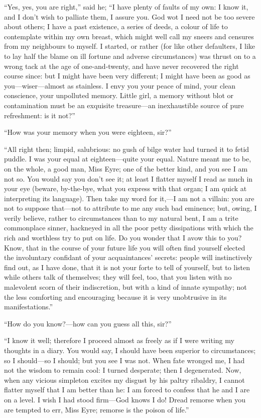 \enquote{Yes, yes, you are right,} said he; \enquote{I have plenty of
	faults of my own: I know it, and I don't wish to palliate them, I assure
	you. God wot I need not be too severe about others; I have a past
	existence, a series of deeds, a colour of life to contemplate within my
	own breast, which might well call my sneers and censures from my
	neighbours to myself. I started, or rather (for like other defaulters,
	I like to lay half the blame on ill fortune and adverse circumstances)
	was thrust on to a wrong tack at the age of one-and-twenty, and have
	never recovered the right course since: but I might have been very
	different; I might have been as good as you---wiser---almost as
	stainless. I envy you your peace of mind, your clean conscience, your
	unpolluted memory. Little girl, a memory without blot or contamination
	must be an exquisite treasure---an inexhaustible source of pure
	refreshment: is it not?}

\enquote{How was your memory when you were eighteen, sir?}

\enquote{All right then; limpid, salubrious: no gush of bilge water had
	turned it to fetid puddle. I was your equal at eighteen---quite your
	equal. Nature meant me to be, on the whole, a good man, Miss Eyre; one
	of the better kind, and you see I am not so. You would say you don't
	see it; at least I flatter myself I read as much in your eye (beware,
	by-the-bye, what you express with that organ; I am quick at interpreting
	its language). Then take my word for it,---I am not a villain: you are
	not to suppose that---not to attribute to me any such bad eminence; but,
	owing, I verily believe, rather to circumstances than to my natural
	bent, I am a trite commonplace sinner, hackneyed in all the poor petty
	dissipations with which the rich and worthless try to put on life. Do
	you wonder that I avow this to you? Know, that in the course of your
	future life you will often find yourself elected the involuntary
	confidant of your acquaintances' secrets: people will instinctively find
	out, as I have done, that it is not your forte to tell of yourself, but
	to listen while others talk of themselves; they will feel, too, that you
	listen with no malevolent scorn of their indiscretion, but with a kind
	of innate sympathy; not the less comforting and encouraging because it
	is very unobtrusive in its manifestations.}

\enquote{How do you know?---how can you guess all this, sir?}

\enquote{I know it well; therefore I proceed almost as freely as if I
	were writing my thoughts in a diary. You would say, I should have been
	superior to circumstances; so I should---so I should; but you see I was
	not. When fate wronged me, I had not the wisdom to remain cool: I
	turned desperate; then I degenerated. Now, when any vicious simpleton
	excites my disgust by his paltry ribaldry, I cannot flatter myself that
	I am better than he: I am forced to confess that he and I are on a
	level. I wish I had stood firm---God knows I do! Dread remorse when
	you are tempted to err, Miss Eyre; remorse is the poison of life.}

